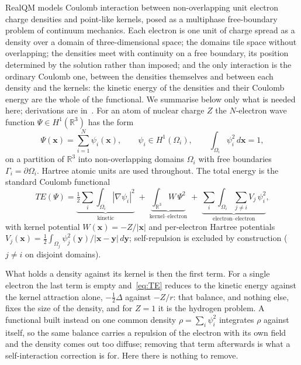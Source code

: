 \documentclass[11pt]{article}
\begin{document}
RealQM models Coulomb interaction between non-overlapping unit electron charge densities
and point-like kernels, posed as a multiphase free-boundary problem of continuum
mechanics. Each electron is one unit of charge spread as a density
over a domain of three-dimensional space; the domains tile space without overlapping; the
densities meet with continuity on a free boundary, its position determined by the solution
rather than imposed; and the only interaction is the ordinary Coulomb one, between the densities
themselves and between each density and the kernels: the kinetic energy of the densities and
their Coulomb energy are the whole of the functional. We summarise below only what is
needed here; derivations are in~\cite{Johnson-RealQM}. For an atom of nuclear charge $Z$ the
$N$-electron wave function $\Psi\in H^1(\mathbb{R}^3)$ has the form
\begin{equation}\label{eq:Psi-sum}
\Psi(\mathbf{x}) = \sum_{i=1}^{N} \psi_i(\mathbf{x}),
\qquad \psi_i \in H^1(\Omega_i),
\qquad \int_{\Omega_i} \psi_i^2 \, d\mathbf{x} = 1,
\end{equation}
on a partition of $\mathbb{R}^3$ into non-overlapping domains $\Omega_i$ with free
boundaries $\Gamma_i=\partial\Omega_i$. Hartree atomic units are used throughout. The total
energy is the standard Coulomb functional
\begin{equation}\label{eq:TE}
TE(\Psi)=\underbrace{\tfrac12\sum_i\int_{\Omega_i}|\nabla\psi_i|^2}_{\text{kinetic}}
\;+\;\underbrace{\int_{\mathbb{R}^3} W\,\Psi^2}_{\text{kernel--electron}}
\;+\;\underbrace{\sum_i\int_{\Omega_i}\sum_{j\ne i}V_j\,\psi_i^2}_{\text{electron--electron}},
\end{equation}
with kernel potential $W(\mathbf{x})=-Z/|\mathbf{x}|$ and per-electron Hartree
potentials
$V_j(\mathbf{x})=\tfrac12\int_{\Omega_j}\psi_j^2(\mathbf{y})/|\mathbf{x}-\mathbf{y}|\,d\mathbf{y}$;
self-repulsion is excluded by construction ($j\ne i$ on disjoint domains).

What holds a density against its kernel is then the first term. For a single electron the last
term is empty and~\eqref{eq:TE} reduces to the kinetic energy against the kernel attraction
alone, $-\tfrac12\Delta$ against $-Z/r$: that balance, and nothing else, fixes the size of the
density, and for $Z=1$ it is the hydrogen problem. A functional built instead on one common
density $\rho=\sum_i\psi_i^2$ integrates $\rho$ against itself, so the same balance carries a
repulsion of the electron with its own field and the density comes out too diffuse; removing
that term afterwards is what a self-interaction correction is for. Here there is nothing to
remove.
\end{document}
